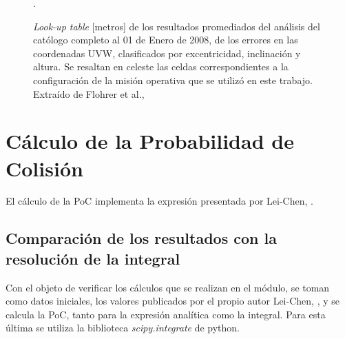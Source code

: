 \begin{figure}[!h]
  \centering
  \caption{{\it{Look-up table}} [metros] de los resultados promediados del an\'alisis del cat\'ologo completo al 01 de Enero de 2008, de los errores en las coordenadas UVW, clasificados por excentricidad, inclinaci\'on y altura. Se resaltan en celeste las celdas correspondientes a la configuraci\'on de la misi\'on operativa que se utiliz\'o en este trabajo. Extra\'ido de Flohrer et al., \citep{flohrer2008assessment}}.
  \label{fig:flohrer}
\end{figure}

% 

\section{C\'alculo de la Probabilidad de Colisi\'on}

El c\'alculo de la PoC implementa la expresi\'on presentada por Lei-Chen, \citep{leichen}.


\subsection*{Comparaci\'on de los resultados con la resoluci\'on de la integral}
Con el objeto de verificar los c\'alculos que se realizan en el m\'odulo, se toman como datos iniciales, los valores publicados por el propio autor Lei-Chen, \citep{leichen}, y se calcula la PoC, tanto para la expresi\'on anal\'itica como la integral. Para esta \'ultima se utiliza la biblioteca {\it{scipy.integrate}}  de python.

